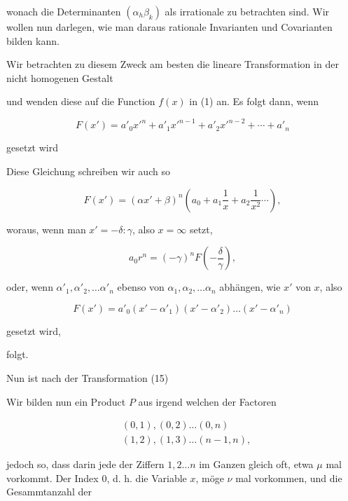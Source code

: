 

wonach die Determinanten $(\alpha_h\beta_k)$ als irrationale  zu betrachten sind. Wir wollen nun darlegen, wie man daraus rationale Invarianten und Covarianten bilden kann.

Wir betrachten zu diesem Zweck am besten die lineare Transformation in der nicht homogenen Gestalt


und wenden diese auf die Function $f(x)$ in (1) an. Es folgt dann, wenn

\[
F(x') = a'_0 x'^n + a'_1 x'^{n-1} + a'_2 x'^{n-2} + \cdots + a'_n
\]

gesetzt wird


Diese Gleichung schreiben wir auch so

\[
F(x') = (\alpha x' + \beta)^n \left(a_0 + a_1 \frac{1}{x} + a_2 \frac{1}{x^2} \cdots\right),
\]

woraus, wenn man $x' = -\delta : \gamma$, also $x = \infty$ setzt,

\[
a_0 r^n = (-\gamma)^n F\left(-\frac{\delta}{\gamma}\right),
\]

oder, wenn $\alpha'_1, \alpha'_2, \ldots \alpha'_n$ ebenso von $\alpha_1, \alpha_2, \ldots \alpha_n$ abhängen, wie $x'$ von $x$, also

\[
F(x') = a'_0 (x' - \alpha'_1)(x' - \alpha'_2) \ldots (x' - \alpha'_n)
\]

gesetzt wird,


folgt.

Nun ist nach der Transformation (15)


Wir bilden nun ein Product $P$ aus irgend welchen der Factoren

\[
\begin{aligned}
&(0, 1), (0, 2) \ldots (0, n) \\
&(1, 2), (1, 3) \ldots (n - 1, n),
\end{aligned}
\]

jedoch so, dass darin jede der Ziffern $1, 2 \ldots n$ im Ganzen gleich oft, etwa $\mu$ mal vorkommt. Der Index $0$, d. h. die Variable $x$, möge $\nu$ mal vorkommen, und die Gesammtanzahl der
